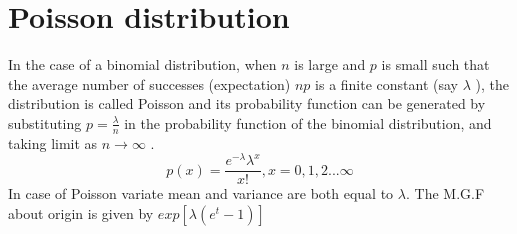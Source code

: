 \documentclass{article}
\begin{document}
\section{Poisson distribution}
In the case of a binomial distribution, when $ n $ is large and $ p $ is small such that the average number of successes (expectation) $ np $ is a finite constant (say $ \lambda $ ),
the distribution is called Poisson and its probability function can be generated by substituting $ p = \frac{\lambda}{n} $ in the probability function of the binomial distribution, and taking limit as $ n \to \infty $ . 
\begin{equation*}
p(x) = \frac{e^{- \lambda} \lambda^{x}}{x!}, x = 0,1,2... \infty
\end{equation*}
In case of Poisson variate mean and variance are both equal to $ \lambda $. The M.G.F about origin is given by $ exp[\lambda(e^{t}-1)] $   
\end{document}
